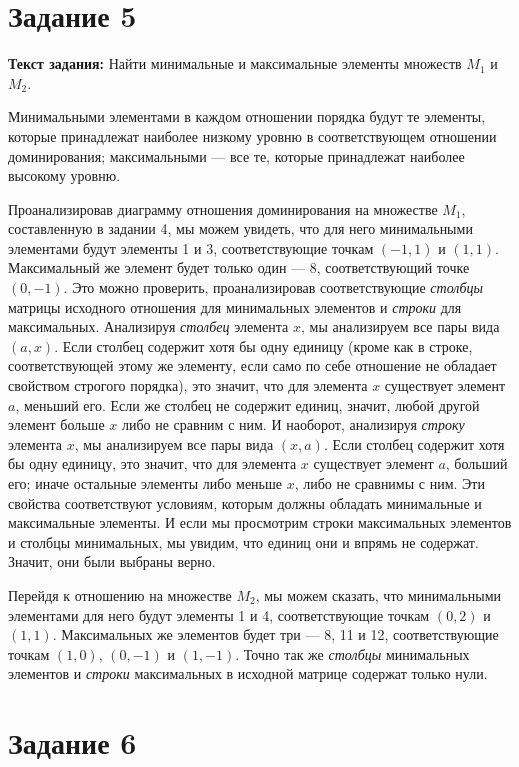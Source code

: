 \documentclass[12pt]{article}
\begin{document}
	\section{Задание 5}
	\label{task5}
	
	{\bf Текст задания:} Найти минимальные и максимальные элементы множеств $M_1$ и $M_2$. 
	
	Минимальными элементами в каждом отношении порядка будут те элементы, которые принадлежат наиболее низкому уровню в соответствующем отношении доминирования; максимальными --- все те, которые принадлежат наиболее высокому уровню.
	
	Проанализировав диаграмму отношения доминирования на множестве $M_1$, составленную в задании 4, мы можем увидеть, что	для него минимальными элементами будут элементы 1 и 3, соответствующие точкам $(-1, 1)$ и $(1, 1)$. Максимальный же элемент будет только один --- 8, соответствующий точке $(0, -1)$. Это можно проверить, проанализировав соответствующие {\it столбцы} матрицы исходного отношения для минимальных элементов и {\it строки} для максимальных. Анализируя {\it столбец} элемента $x$, мы анализируем все пары вида $(a, x)$. Если столбец содержит хотя бы одну единицу (кроме как в строке, соответствующей этому же элементу, если само по себе отношение не обладает свойством строгого порядка), это значит, что для элемента $x$ существует элемент $a$, меньший его. Если же столбец не содержит единиц, значит, любой другой элемент больше $x$ либо не сравним с ним. И наоборот, анализируя {\it строку} элемента $x$, мы анализируем все пары вида $(x, a)$. Если столбец содержит хотя бы одну единицу, это значит, что для элемента $x$ существует элемент $a$, больший его; иначе остальные элементы либо меньше $x$, либо не сравнимы с ним. Эти свойства соответствуют условиям, которым должны обладать минимальные и максимальные элементы. И если мы просмотрим строки максимальных элементов и столбцы минимальных, мы увидим, что единиц они и впрямь не содержат. Значит, они были выбраны верно.
	
	Перейдя к отношению на множестве $M_2$, мы можем сказать, что минимальными элементами для него будут элементы 1 и 4, соответствующие точкам $(0, 2)$ и $(1, 1)$. Максимальных же элементов будет три --- 8, 11 и 12, соответствующие точкам $(1, 0)$, $(0, -1)$ и $(1, -1)$. Точно так же {\it столбцы} минимальных элементов и {\it строки} максимальных в исходной матрице содержат только нули. 
		
	\section{Задание 6}
	\label{task6}
		
\end{document}

